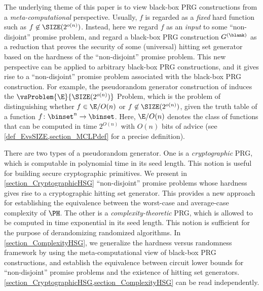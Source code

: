 \documentclass[11pt]{article}
\numberwithin{equation}{section}
\theoremstyle{definition}
\theoremstyle{plain}
\begin{document}
The underlying theme of this paper is to view black-box PRG constructions from a \emph{meta-computational} perspective.
Usually, $f$ is regarded as a \emph{fixed} hard function such
as $f \not\in \SIZE(2^{o(n)})$.
Instead, here we regard $f$ as an \emph{input} to some ``non-disjoint'' promise problem, and regard a black-box PRG construction $G^{(\blank)}$ as a
reduction
that proves the security of some (universal) hitting set generator
based on the hardness of the ``non-disjoint'' promise problem.
This new perspective can be applied to arbitrary black-box
PRG constructions,
and it gives rise to a ``non-disjoint'' promise problem associated with the black-box PRG construction.
For example, the pseudorandom generator construction of \cite{ImpagliazzoW97_stoc_conf} induces the $\vsProblem{\E}{\SIZE(2^{o(n)})}$ Problem,
which is the problem of distinguishing whether $f \in \E/O(n)$
or $f \not\in \SIZE(2^{o(n)})$,
given the truth table of a function $f \colon \binset^n \to \binset$.
Here, $\E/O(n)$ denotes the class of functions that can be computed in time $2^{O(n)}$ with $O(n)$ bits of advice (see \cref{def_EvsSIZE,section_MCLPdef} for a precise definition).

%
%
%
%
%
%
%
%
%


There are two types of a pseudorandom generator.
One is a \emph{cryptographic} PRG, which is computable in polynomial time in its seed length.
This notion is useful for building secure cryptographic primitives.
We present
in \cref{section_CryptographicHSG}
``non-disjoint'' promise problems
whose hardness gives rise to a cryptographic hitting set generator.
This provides
a new approach for establishing the equivalence between the worst-case and average-case complexity of $\PH$.
The other is a \emph{complexity-theoretic} PRG, which is allowed to be computed in time exponential in its seed length.
This notion is sufficient for the purpose of derandomizing randomized algorithms.
In \cref{section_ComplexityHSG},
we generalize the hardness versus randomness framework by
using the meta-computational view of black-box PRG constructions,
and establish the equivalence between
circuit lower bounds for ``non-disjoint'' promise problems
and
the existence of hitting set generators.
\cref{section_CryptographicHSG,section_ComplexityHSG} can be read independently.

%
%
%
%
%
%
%
%
%
%

%
%
%
%
%
%
%
%
%
%

%
%

%
%
%
%
%
%
%
%
\end{document}
